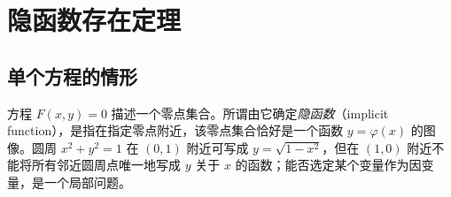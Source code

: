 \section{隐函数存在定理}
\label{sec:implicit-function-existence-theorem}


\subsection{单个方程的情形}
\label{subsec:implicit-function-for-one-equation}

方程 $F(x,y)=0$ 描述一个零点集合。所谓由它确定\emph{隐函数}（implicit function），是指在指定零点附近，该零点集合恰好是一个函数 $y=\varphi(x)$ 的图像。圆周 $x^2+y^2=1$ 在 $(0,1)$ 附近可写成 $y=\sqrt{1-x^2}$，但在 $(1,0)$ 附近不能将所有邻近圆周点唯一地写成 $y$ 关于 $x$ 的函数；能否选定某个变量作为因变量，是一个局部问题。


